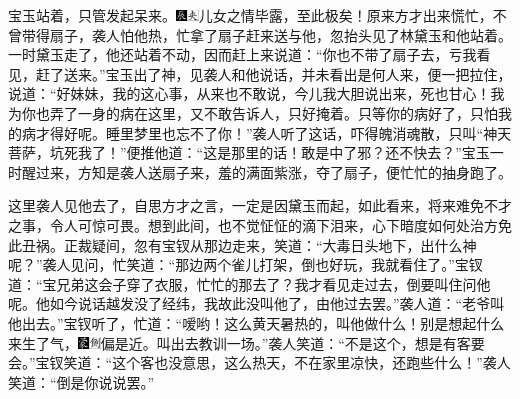 宝玉站着，只管发起呆来。{\includegraphics[width=3mm]{../Images/00009}\includegraphics[width=3mm]{../Images/00012}\footnotesize \kaishu 儿女之情毕露，至此极矣！}原来方才出来慌忙，不曾带得扇子，袭人怕他热，忙拿了扇子赶来送与他，忽抬头见了林黛玉和他站着。一时黛玉走了，他还站着不动，因而赶上来说道：``你也不带了扇子去，亏我看见，赶了送来。''宝玉出了神，见袭人和他说话，并未看出是何人来，便一把拉住，说道：``好妹妹，我的这心事，从来也不敢说，今儿我大胆说出来，死也甘心！我为你也弄了一身的病在这里，又不敢告诉人，只好掩着。只等你的病好了，只怕我的病才得好呢。睡里梦里也忘不了你！''袭人听了这话，吓得魄消魂散，只叫``神天菩萨，坑死我了！''便推他道：``这是那里的话！敢是中了邪？还不快去？''宝玉一时醒过来，方知是袭人送扇子来，羞的满面紫涨，夺了扇子，便忙忙的抽身跑了。

这里袭人见他去了，自思方才之言，一定是因黛玉而起，如此看来，将来难免不才之事，令人可惊可畏。想到此间，也不觉怔怔的滴下泪来，心下暗度如何处治方免此丑祸。正裁疑间，忽有宝钗从那边走来，笑道：``大毒日头地下，出什么神呢？''袭人见问，忙笑道：``那边两个雀儿打架，倒也好玩，我就看住了。''宝钗道：``宝兄弟这会子穿了衣服，忙忙的那去了？我才看见走过去，倒要叫住问他呢。他如今说话越发没了经纬，我故此没叫他了，由他过去罢。''袭人道：``老爷叫他出去。''宝钗听了，忙道：``嗳哟！这么黄天暑热的，叫他做什么！别是想起什么来生了气，{\includegraphics[width=3mm]{../Images/00006}\includegraphics[width=3mm]{../Images/00011}\footnotesize \kaishu 偏是近。}叫出去教训一场。''袭人笑道：``不是这个，想是有客要会。''宝钗笑道：``这个客也没意思，这么热天，不在家里凉快，还跑些什么！''袭人笑道：``倒是你说说罢。''

